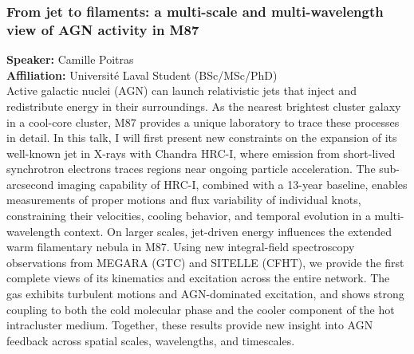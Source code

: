 \hypertarget{abs-43}{}
\subsubsection*{From jet to filaments: a multi-scale and multi-wavelength view of AGN activity in M87}
\textbf{Speaker:} Camille Poitras \\
\textbf{Affiliation:} Université Laval \textperiodcentered{} Student (BSc/MSc/PhD)\\
Active galactic nuclei (AGN) can launch relativistic jets that inject and redistribute energy in their surroundings. As the nearest brightest cluster galaxy in a cool-core cluster, M87 provides a unique laboratory to trace these processes in detail. In this talk, I will first present new constraints on the expansion of its well-known jet in X-rays with Chandra HRC-I, where emission from short-lived synchrotron electrons traces regions near ongoing particle acceleration. The sub-arcsecond imaging capability of HRC-I, combined with a 13-year baseline, enables measurements of proper motions and flux variability of individual knots, constraining their velocities, cooling behavior, and temporal evolution in a multi-wavelength context. On larger scales, jet-driven energy influences the extended warm filamentary nebula in M87. Using new integral-field spectroscopy observations from MEGARA (GTC) and SITELLE (CFHT), we provide the first complete views of its kinematics and excitation across the entire network. The gas exhibits turbulent motions and AGN-dominated excitation, and shows strong coupling to both the cold molecular phase and the cooler component of the hot intracluster medium. Together, these results provide new insight into AGN feedback across spatial scales, wavelengths, and timescales.

\hypertarget{abs-44}{}
